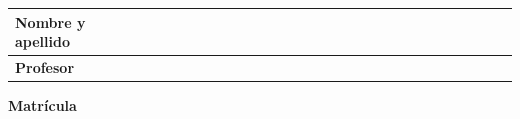 \documentclass[11pt]{article}
\begin{document}
\vspace{3mm}
\hspace{-25mm}
{
\def\arraystretch{1.5}
\begin{tabular}{|l||p{3mm}|p{3mm}|p{3mm}|p{3mm}|p{3mm}|p{3mm}|p{3mm}|p{3mm}|p{3mm}|p{3mm}|p{3mm}|p{3mm}|p{3mm}|p{3mm}|p{3mm}|p{3mm}|p{3mm}|p{3mm}|p{3mm}||}
\hline {\bf Nombre y apellido}
&\ & \ & \ & \ & \ & \ & \ & \ & \ & \ & \ & \ & \ & \ & \ & \ & \ & \ & \   \\
\hline {\bf Profesor}
&\ & \ & \ & \ & \ & \ & \ & \ & \ & \ & \ & \ & \ & \ & \ & \ & \ & \ & \   \\
\hline
\end{tabular}
}

\vspace{3mm}
\hspace{-20mm}
\begin{minipage}{80mm}
{\bf Matr\'icula}


\end{minipage}
\end{document}
